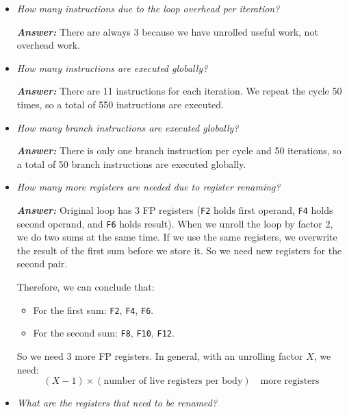 \begin{itemize}
    
    \item \emph{How many instructions due to the loop overhead per iteration?}

    \textcolor{Green3}{\textbf{\emph{Answer:}}} There are always 3 because we have unrolled useful work, not overhead work.
    
    
    \item \emph{How many instructions are executed globally?}

    \textcolor{Green3}{\textbf{\emph{Answer:}}} There are 11 instructions for each iteration. We repeat the cycle 50 times, so a total of 550 instructions are executed.
    
    
    \item \emph{How many branch instructions are executed globally?}

    \textcolor{Green3}{\textbf{\emph{Answer:}}} There is only one branch instruction per cycle and 50 iterations, so a total of 50 branch instructions are executed globally.
    
    
    \item \emph{How many more registers are needed due to register renaming?}

    \textcolor{Green3}{\textbf{\emph{Answer:}}} Original loop has 3 FP registers (\texttt{F2} holds first operand, \texttt{F4} holds second operand, and \texttt{F6} holds result). When we unroll the loop by factor 2, we do two sums at the same time. If we use the same registers, we overwrite the result of the first sum before we store it. So we need new registers for the second pair.

    \newpage

    \noindent
    Therefore, we can conclude that:
    \begin{itemize}
        \item For the first sum: \texttt{F2}, \texttt{F4}, \texttt{F6}.
        \item For the second sum: \texttt{F8}, \texttt{F10}, \texttt{F12}.
    \end{itemize}
    So we need 3 more FP registers. In general, with an unrolling factor $X$, we need:
    \begin{equation*}
        \left(X-1\right) \times \left(\text{number of live registers per body}\right) \quad \text{more registers}
    \end{equation*}    
    
    
    \item \emph{What are the registers that need to be renamed?}


\end{itemize}
